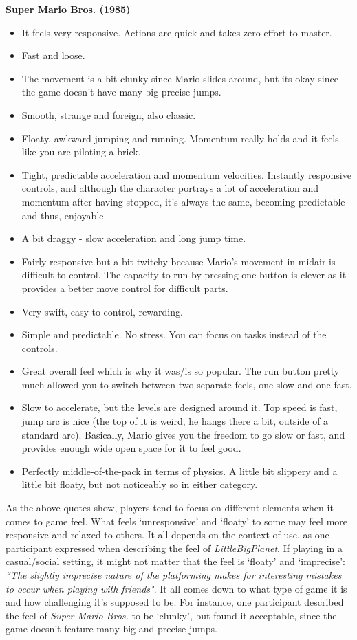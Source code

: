 \textbf{Super Mario Bros. (1985)}
\vspace{-5mm}
\begin{itemize}[noitemsep,nolistsep]
\item It feels very responsive. Actions are quick and takes zero effort to master.
\item Fast and loose.
\item The movement is a bit clunky since Mario slides around, but its okay since the game doesn't have many big precise jumps.
\item Smooth, strange and foreign, also classic.
\item Floaty, awkward jumping and running. Momentum really holds and it feels like you are piloting a brick.
\item Tight, predictable acceleration and momentum velocities. Instantly responsive controls, and although the character portrays a lot of acceleration and momentum after having stopped, it's always the same, becoming predictable and thus, enjoyable.
\item A bit draggy - slow acceleration and long jump time.
\item Fairly responsive but a bit twitchy because Mario's movement in midair is difficult to control. The capacity to run by pressing one button is clever as it provides a better move control for difficult parts.
\item Very swift, easy to control, rewarding.
\item Simple and predictable. No stress. You can focus on tasks instead of the controls.
\item Great overall feel which is why it was/is so popular. The run button pretty much allowed you to switch between two separate feels, one slow and one fast.
\item Slow to accelerate, but the levels are designed around it. Top speed is fast, jump arc is nice (the top of it is weird, he hangs there a bit, outside of a standard arc). Basically, Mario gives you the freedom to go slow or fast, and provides enough wide open space for it to feel good.
\item Perfectly middle-of-the-pack in terms of physics. A little bit slippery and a little bit floaty, but not noticeably so in either category.
\end{itemize}

As the above quotes show, players tend to focus on different elements when it comes to game feel. What feels `unresponsive' and `floaty' to some may feel more responsive and relaxed to others. It all depends on the context of use, as one participant expressed when describing the feel of \textit{LittleBigPlanet}. If playing in a casual/social setting, it might not matter that the feel is `floaty' and `imprecise': \textit{``The slightly imprecise nature of the platforming makes for interesting mistakes to occur when playing with friends"}. It all comes down to what type of game it is and how challenging it's supposed to be. For instance, one participant described the feel of \textit{Super Mario Bros.} to be `clunky', but found it acceptable, since the game doesn't feature many big and precise jumps.

